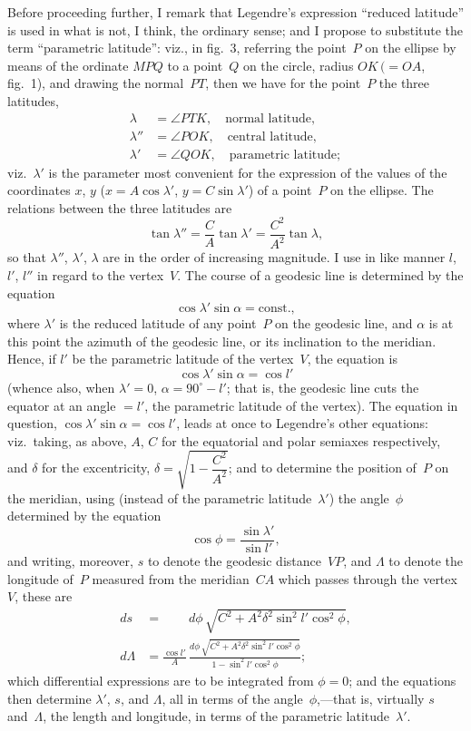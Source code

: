 \documentclass[11pt,a4paper]{article}
\theoremstyle{plain}
\theoremstyle{definition}
\begin{document}
Before proceeding further, I remark that Legendre's expression ``reduced latitude''
is used in what is not, I think, the ordinary sense; and I propose to substitute the
term ``parametric latitude'': viz., in fig.~3, referring the point~$P$ on the ellipse by means
of the ordinate $MPQ$ to a point~$Q$ on the circle, radius $OK\,(=OA$, fig.~1), and drawing
the normal~$PT$, then we have for the point~$P$ the three latitudes,
\begin{align*}
\lambda  &= \angle PTK, \quad \text{normal latitude}, \\
\lambda'' &= \angle POK, \quad \text{central latitude}, \\
\lambda'  &= \angle QOK, \quad \text{parametric latitude};
\end{align*}
viz.\ $\lambda'$ is the parameter most convenient for the expression of the values of the
coordinates $x$, $y$ ($x = A\cos\lambda'$, $y = C\sin\lambda'$) of a point~$P$ on the ellipse.  The relations
between the three latitudes are
\[
\tan\lambda'' = \frac{C}{A}\tan\lambda' = \frac{C^2}{A^2}\tan\lambda,
\]
so that $\lambda''$, $\lambda'$, $\lambda$ are in the order of increasing magnitude.  I use in like manner
$l$, $l'$, $l''$ in regard to the vertex~$V$.  The course of a geodesic line is determined by the
equation
\[
\cos\lambda'\sin\alpha = \text{const.},
\]
where $\lambda'$ is the reduced latitude of any point~$P$ on the geodesic line, and $\alpha$ is at
this point the azimuth of the geodesic line, or its inclination to the meridian.  Hence,
if $l'$ be the parametric latitude of the vertex~$V$, the equation is
\[
\cos\lambda'\sin\alpha = \cos l'
\]
(whence also, when $\lambda'=0$, $\alpha = 90^\circ-l'$; that is, the geodesic line cuts the equator at
an angle $=l'$, the parametric latitude of the vertex).  The equation in question,
$\cos\lambda'\sin\alpha = \cos l'$, leads at once to Legendre's other equations: viz.\ taking,
as above, $A$, $C$ for the equatorial and polar semiaxes respectively, and $\delta$ for the
excentricity, $\delta = \sqrt{1 - \dfrac{C^2}{A^2}}$; and to determine the position of~$P$ on the meridian,
using (instead of the parametric latitude~$\lambda'$) the angle~$\phi$ determined by the equation
\[
\cos\phi = \frac{\sin\lambda'}{\sin l'},
\]
and writing, moreover, $s$ to denote the geodesic distance~$VP$, and $\Lambda$ to denote the
longitude of~$P$ measured from the meridian~$CA$ which passes through the vertex~$V$,
these are
\begin{align*}
ds &= \phantom{\frac{\cos l'}{A}\,} d\phi\,\sqrt{C^2 + A^2\delta^2\sin^2 l'\cos^2\phi}, \\
d\Lambda &= \frac{\cos l'}{A}\,
\frac{d\phi\,\sqrt{C^2 + A^2\delta^2\sin^2 l'\cos^2\phi}}{1 - \sin^2 l'\cos^2\phi};
\end{align*}
which differential expressions are to be integrated from $\phi=0$; and the equations then
determine $\lambda'$, $s$, and $\Lambda$, all in terms of the angle~$\phi$,---that is, virtually $s$ and~$\Lambda$, the
length and longitude, in terms of the parametric latitude~$\lambda'$.
\end{document}
